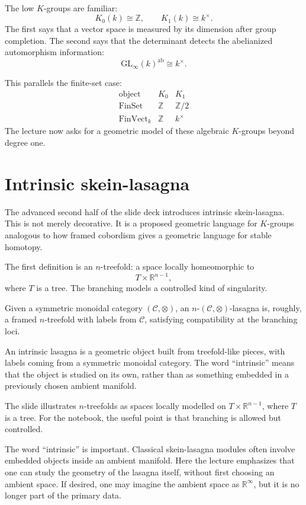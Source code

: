 The low \(K\)-groups are familiar:
\[
  K_0(k)\cong\mathbb Z,
  \qquad
  K_1(k)\cong k^\times.
\]
The first says that a vector space is measured by its dimension after group completion.  The second says that the determinant detects the abelianized automorphism information:
\[
  \mathrm{GL}_\infty(k)^{\mathrm{ab}}\cong k^\times.
\]

This parallels the finite-set case:
\[
\begin{array}{c|c|c}
\text{object} & K_0 & K_1\\
\hline
\mathrm{FinSet} & \mathbb Z & \mathbb Z/2\\
\mathrm{FinVect}_k & \mathbb Z & k^\times
\end{array}
\]
The lecture now asks for a geometric model of these algebraic \(K\)-groups beyond degree one.

\section{Intrinsic skein-lasagna}

The advanced second half of the slide deck introduces intrinsic skein-lasagna.  This is not merely decorative.  It is a proposed geometric language for \(K\)-groups analogous to how framed cobordism gives a geometric language for stable homotopy.

The first definition is an \(n\)-treefold: a space locally homeomorphic to
\[
  T\times \mathbb R^{n-1},
\]
where \(T\) is a tree.  The branching models a controlled kind of singularity.

Given a symmetric monoidal category \((\mathcal C,\otimes)\), an \(n\)-\((\mathcal C,\otimes)\)-lasagna is, roughly, a framed \(n\)-treefold with labels from \(\mathcal C\), satisfying compatibility at the branching loci.

\begin{definition}
An intrinsic lasagna is a geometric object built from treefold-like pieces, with labels coming from a symmetric monoidal category.  The word ``intrinsic'' means that the object is studied on its own, rather than as something embedded in a previously chosen ambient manifold.
\end{definition}

The slide illustrates \(n\)-treefolds as spaces locally modelled on \(T\times\mathbb R^{n-1}\), where \(T\) is a tree.  For the notebook, the useful point is that branching is allowed but controlled.


The word ``intrinsic'' is important.  Classical skein-lasagna modules often involve embedded objects inside an ambient manifold.  Here the lecture emphasizes that one can study the geometry of the lasagna itself, without first choosing an ambient space.  If desired, one may imagine the ambient space as \(\mathbb R^\infty\), but it is no longer part of the primary data.


